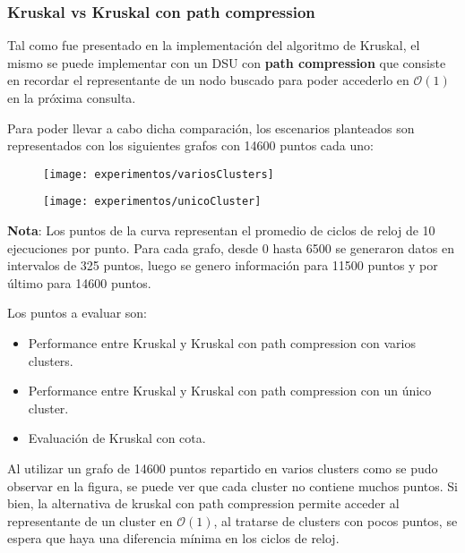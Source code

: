 \subsubsection{Kruskal vs Kruskal con path compression}
Tal como fue presentado en la implementación del algoritmo de Kruskal, el mismo se puede implementar con un DSU con \textbf{path compression} que consiste en recordar el representante de un nodo buscado para poder accederlo en $\mathcal{O}(1)$ en la próxima consulta.

Para poder llevar a cabo dicha comparación, los escenarios planteados son representados con los siguientes grafos con 14600 puntos cada uno:

\begin{figure}[H]
	\centering
	\begin{minipage}[t]{.3\textwidth}
		\centering
		\texttt{[image: experimentos/variosClusters]}
	\end{minipage}\qquad
	\centering
	\begin{minipage}[t]{.3\textwidth}
		\centering
		\texttt{[image: experimentos/unicoCluster]}
	\end{minipage}\qquad
\end{figure}	

\textbf{Nota}: Los puntos de la curva representan el promedio de ciclos de reloj de 10 ejecuciones por punto. Para cada grafo, desde 0 hasta 6500 se generaron datos en intervalos de 325 puntos, luego se genero información para 11500 puntos y por último para 14600 puntos.

\vspace{10 pt}

Los puntos a evaluar son:
\begin{itemize}
\item Performance entre Kruskal y Kruskal con path compression con varios clusters.
\item Performance entre Kruskal y Kruskal con path compression con un único cluster.
\item Evaluación de Kruskal con cota.
\end{itemize}




Al utilizar un grafo de 14600 puntos repartido en varios clusters como se pudo observar en la figura, se puede ver que cada cluster no contiene muchos puntos. Si bien, la alternativa de kruskal con path compression permite acceder al representante de un cluster en  $\mathcal{O}(1)$, al tratarse de clusters con pocos puntos, se espera que haya una diferencia mínima en los ciclos de reloj.

